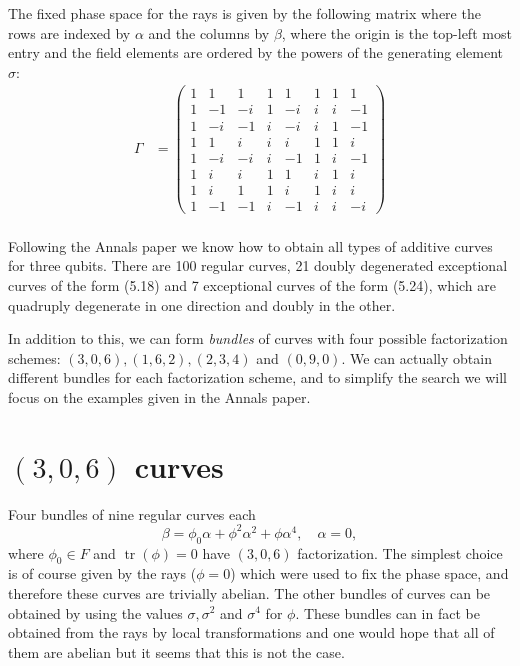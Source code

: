 \documentclass[a4paper]{article}
\DeclareMathOperator{\tr}{tr}
\begin{document}
  The fixed phase space for the rays is given by the
  following matrix where the rows are indexed by $\alpha$
  and the columns by $\beta$, where the origin is the
  top-left most entry and the field elements are ordered by
  the powers of the generating element $\sigma$:
  \begin{align}
    \Gamma
    &=
    \displaystyle \left(\begin{array}{rrrrrrrr}
    1 & 1 & 1 & 1 & 1 & 1 & 1 & 1 \\
    1 & -1 & -i & 1 & -i & i & i & -1 \\
    1 & -i & -1 & i & -i & i & 1 & -1 \\
    1 & 1 & i & i & i & 1 & 1 & i \\
    1 & -i & -i & i & -1 & 1 & i & -1 \\
    1 & i & i & 1 & 1 & i & 1 & i \\
    1 & i & 1 & 1 & i & 1 & i & i \\
    1 & -1 & -1 & i & -1 & i & i & -i
    \end{array}\right) \\
  \end{align}

  Following the Annals paper we know how to obtain all types
  of additive curves for three qubits. There are 100 regular
  curves, 21 doubly degenerated exceptional curves of the
  form (5.18) and 7 exceptional curves of the form (5.24),
  which are quadruply degenerate in one direction and doubly
  in the other. 

  In addition to this, we can form \textit{bundles} of
  curves with four possible factorization schemes: $(3,0,6),
  (1,6,2), (2,3,4)$ and $(0,9,0)$. We can actually obtain
  different bundles for each factorization scheme, and
  to simplify the search we will focus on the examples given
  in the Annals paper.

  \section{$(3,0,6)$ curves}

  Four bundles of nine regular curves each
  \begin{equation}
    \beta = \phi_0 \alpha + \phi^2 \alpha^2 + \phi
    \alpha^{4},
    \quad
    \alpha = 0,
  \end{equation}
  where $\phi_0 \in F$ and $\tr(\phi) = 0$ have $(3,0,6)$ 
  factorization. The simplest choice is of course given by
  the rays ($\phi = 0$) which were used to fix the phase
  space, and therefore these curves are trivially abelian.
  The other bundles of curves can be obtained by using the
  values $\sigma, \sigma^2$ and $\sigma^{4}$ for $\phi$.
  These bundles can in fact be obtained from the rays by
  local transformations and one would hope that all of them
  are abelian but it seems that this is not the case. 
\end{document}
